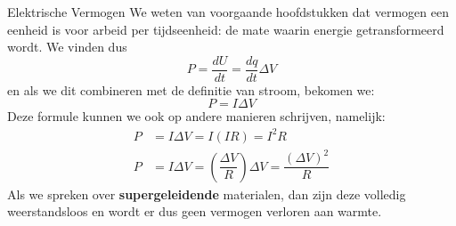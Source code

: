 \begin{theo}{Elektrische Vermogen}
    We weten van voorgaande hoofdstukken dat vermogen een eenheid is voor arbeid per tijdseenheid: de mate waarin energie getransformeerd wordt. We vinden dus
    \begin{equation*}
        P = \dfrac{dU}{dt} = \dfrac{dq}{dt}\Delta V
    \end{equation*}
    en als we dit combineren met de definitie van stroom, bekomen we:
    \begin{equation*}
        P = I\Delta V
    \end{equation*}
    Deze formule kunnen we ook op andere manieren schrijven, namelijk:
    \begin{align*}
        P &=  I\Delta V= I(IR) = I^2R\\
        P &= I\Delta V = \left(\dfrac{\Delta V}{R}\right)\Delta V = \dfrac{(\Delta V)^2}{R}
    \end{align*}
    Als we spreken over \textbf{supergeleidende} materialen, dan zijn deze volledig weerstandsloos en wordt er dus geen vermogen verloren aan warmte.
\end{theo}





    

    


